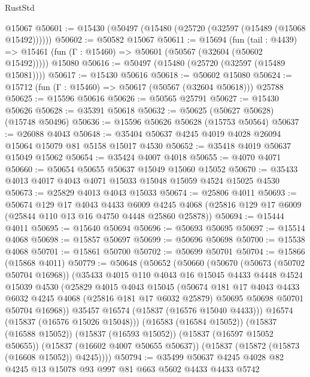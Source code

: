 \begin{lexlean}{RustStd}
\begin{coremodule}
{\begin{coremodule}
{{{{{{{{{{{{{{{{{{{{{{{{{{{{{{{{{{{{{{{{{{{{{{{{{{{{{{{{{{{{    @15067
@50601 := @15430 (@50497 (@15480 (@25720 (@32597 (@15489 (@15068 @15492))))))
@50602 := @50582 @15067
@50611 := @15694
    (fun (tail : @4439) => @15461 (fun (Γ : @15460) => @50601 (@50567 (@32604 (@50602 @15492)))))
    @15080
@50616 := @50497 (@15480 (@25720 (@32597 (@15489 @15081))))
@50617 := @15430 @50616
@50618 := @50602 @15080
@50624 := @15712 (fun (Γ : @15460) => @50617 (@50567 (@32604 @50618))) @25788
@50625 := @15596 @50616
@50626 := @50565 @25791
@50627 := @15430 @50626
@50628 := @35391 @50618
@50632 := @50625 (@50627 @50628) (@15748 @50496)
@50636 := @15596 @50626 @50628 (@15753 @50564)
@50637 := @26088 @4043
@50648 := @35404 @50637 @4245 @4019 @4028 @26094 @15064 @15079 @81 @5158 @15017 @4530
@50652 := @35418 @4019 @50637 @15049 @15062
@50654 := @35424 @4007 @4018
@50655 := @4070 @4071
@50660 := @50654 @50655 @50637 @15049 @15060 @15052
@50670 := @35433 @4013 @4017 @4043 @4071 @15033 @15048 @15059 @4524 @15025 @4530
@50673 := @25829 @4013 @4043 @15033
@50674 := @25806 @4011
@50693 := @50674
    @129
    @17
    @4043
    @4433
    @6009
    @4245
    @4068
    (@25816 @129 @17 @6009 (@25844 @110 @13 @16 @4750 @4448 @25860 @25878))
@50694 := @15444 @4011
@50695 := @15640 @50694
@50696 := @50693 @50695
@50697 := @15514 @4068
@50698 := @15857 @50697
@50699 := @50696 @50698
@50700 := @15538 @4068
@50701 := @15861 @50700
@50702 := @50699 @50701
@50704 := @15866 (@15868 @4011)
@50779 := @50648
    (@50652
      (@50660
        (@50670
          (@50673 (@50702 @50704 @16968))
          (@35433
            @4015
            @110
            @4043
            @16
            @15045
            @4433
            @4448
            @4524
            @15039
            @4530
            (@25829
              @4015
              @4043
              @15045
              (@50674
                @181
                @17
                @4043
                @4433
                @6032
                @4245
                @4068
                (@25816 @181 @17 @6032 @25879)
                @50695
                @50698
                @50701
                @50704
                @16968))
            @35457
            @16574
            (@15837 (@16576 @15040 @4433)))
          @16574
          (@15837 (@16576 @15026 @15048)))
        (@16583 (@16584 @15052))
        (@15837 (@16588 @15052))
        (@15837 (@16593 @15052))
        (@15837 (@16597 @15052 @50655))
        (@15837 (@16602 @4007 @50655 @50637))
        (@15837 (@15872 (@15873 (@16608 @15052)) @4245))))
@50794 := @35499 @50637 @4245 @4028 @82 @4245 @13 @15078 @93 @997 @81 @663 @5602 @4433 @4433 @5742
}}}}}}}}}}}}}}}}}}}}}}}}}}}}}}}}}}}}}}}}}}}}}}}}}}}}}}}}}}}}
\end{coremodule}}
\end{coremodule}
\end{lexlean}
